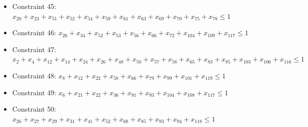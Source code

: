 \documentclass[11pt]{article}
\begin{document}
\begin{itemize}
\item Constraint 45: $x_{20} + x_{23} + x_{51} + x_{52} + x_{54} + x_{59} + x_{61} + x_{63} + x_{69} + x_{70} + x_{75} + x_{78} \le 1$
\item Constraint 46: $x_{26} + x_{34} + x_{52} + x_{53} + x_{56} + x_{66} + x_{72} + x_{104} + x_{109} + x_{117} \le 1$
\item Constraint 47: $x_{2} + x_{4} + x_{12} + x_{14} + x_{24} + x_{26} + x_{48} + x_{50} + x_{57} + x_{58} + x_{65} + x_{83} + x_{85} + x_{103} + x_{106} + x_{116} \le 1$
\item Constraint 48: $x_{8} + x_{12} + x_{22} + x_{58} + x_{66} + x_{79} + x_{99} + x_{101} + x_{119} \le 1$
\item Constraint 49: $x_{6} + x_{21} + x_{22} + x_{36} + x_{91} + x_{93} + x_{104} + x_{108} + x_{117} \le 1$
\item Constraint 50: $x_{26} + x_{27} + x_{29} + x_{31} + x_{41} + x_{52} + x_{68} + x_{85} + x_{93} + x_{94} + x_{118} \le 1$
\end{itemize}
\end{document}
